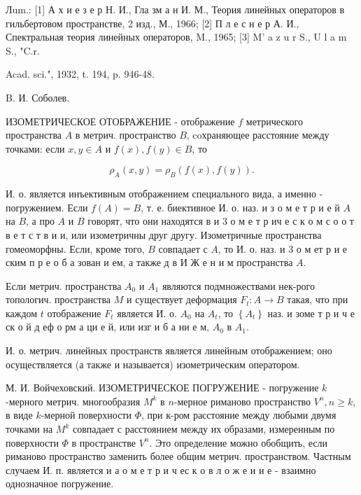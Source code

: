 \documentclass[10pt]{article}
\begin{document}
Лum.: [1] А х и е з е р Н. И., Гла зм а н И. М., Теория линейных операторов в гильбертовом пространстве, 2 изд., М., 1966; [2] П л е с н е р А. И., Спектральная теория линейных операторов, M., 1965; [3] M' a z u r S., U l a m S., "C.r.

Acad. sci.", 1932, t. 194, p. 946-48.

B. И. Соболев.



ИЗОМЕТРИЧЕСКОЕ ОТОБРАЖЕНИЕ - отображение $f$ метрического пространства $A$ в метрич. пространство $B$, coхраняющее расстояние между точками: если $x, y \in A$ и $f(x), f(y) \in B$, то



\[

\rho_{A}(x, y)=\rho_{B}(f(x), f(y)) .

\]



И. о. является инъективным отображением специального вида, а именно - погружением. Если $f(A)=B$, т. е. биективное И. о. наз. и з о м е т р и е й $A$ на $B$, а про $A$ и $B$ говорят, что они находятся в и 3 о м е т р ич е с к о м с о о т в е т с т в и и, или изометричны друг другу. Изометричные пространства гомеоморфны. Если, кроме того, $B$ совпадает с $A$, то И. о. наз. и 3 о м ет р и е ским п р е о б а зован и ем, а также д в И Ж е н и м пространства $A$.



Если метрич. пространства $A_{0}$ и $A_{1}$ являются подмножествами нек-рого топологич. пространства $M$ и существует деформация $F_{t}: A \rightarrow B$ такая, что при каждом $t$ отображение $F_{t}$ является И. о. $A_{0}$ на $A_{t}$, то $\left\{A_{t}\right\}$ наз. и зоме т р и ч е ск о й д еф о рм а ци е й, или изг и б а ни е м, $A_{0}$ в $A_{1}$.



И. о. метрич. линейных пространств является линейным отображением; оно осуществляется (а также и называется) изометрическим оператором.



М. И. Войчеховский. ИЗОМЕТРИЧЕСКОЕ ПОГРУЖЕНИЕ - погружение $k$-мерного метрич. многообразия $M^{k}$ в $n$-мерное риманово пространство $V^{n}, n \geqslant k$, в виде $k$-мерной поверхности $\Phi$, при к-ром расстояние между любыми двумя точками на $M^{k}$ совпадает с расстоянием между их образами, измеренным по поверхности $\Phi$ в пространстве $V^{n}$. Это определение можно обобщить, если риманово пространство заменить более общим метрич. пространством. Частным случаем И. п. является и $а$ о м е т р и ч ес к о в л о ж е и и е - взаимно однозначное погружение.
\end{document}
